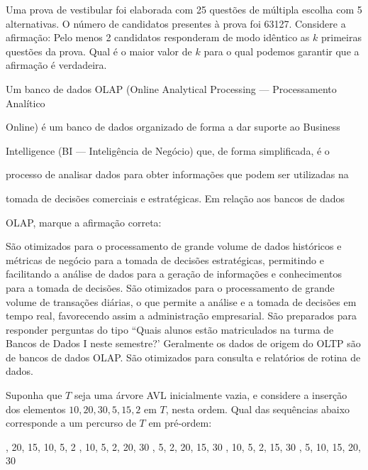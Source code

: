 \documentclass[12pt, addpoints]{exam}
\begin{document}
\begin{questions}
\question

Uma prova de vestibular foi elaborada com 25 questões de múltipla escolha com 5 alternativas. O número de candidatos presentes à prova foi 63127. Considere a afirmação: Pelo menos 2 candidatos responderam de modo idêntico as \( k \) primeiras questões da prova. Qual é o maior valor de \( k \) para o qual podemos garantir que a afirmação é verdadeira.


\begin{choices}
\end{choices}

\question

Um banco de dados OLAP (Online Analytical Processing --- Processamento Analítico

Online) é um banco de dados organizado de forma a dar suporte ao Business

Intelligence (BI --- Inteligência de Negócio) que, de forma simplificada, é o

processo de analisar dados para obter informações que podem ser utilizadas na

tomada de decisões comerciais e estratégicas. Em relação aos bancos de dados

OLAP, marque a afirmação correta:
\begin{choices}
\choice São otimizados para o processamento de grande volume de dados históricos e métricas de negócio para a tomada de decisões estratégicas, permitindo e facilitando a análise de dados para a geração de informações e conhecimentos para a tomada de decisões.
\choice São otimizados para o processamento de grande volume de transações diárias, o que permite a análise e a tomada de decisões em tempo real, favorecendo assim a administração empresarial.
\choice São preparados para responder perguntas do tipo ``Quais alunos estão matriculados na turma de Bancos de Dados I neste semestre?'
\choice Geralmente os dados de origem do OLTP são de bancos de dados OLAP.
\choice São otimizados para consulta e relatórios de rotina de dados.
\end{choices}

\question

Suponha que \( T \) seja uma árvore AVL inicialmente vazia, e considere a inserção dos elementos \(10, 20, 30, 5, 15, 2\) em \( T \), nesta ordem. Qual das sequências abaixo corresponde a um percurso de \( T \) em pré-ordem:
\begin{choices}
, 20, 15, 10, 5, 2
, 10, 5, 2, 20, 30
, 5, 2, 20, 15, 30
, 10, 5, 2, 15, 30
, 5, 10, 15, 20, 30
\end{choices}


\end{questions}
\end{document}
